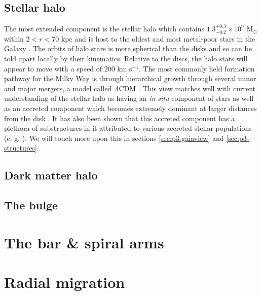 \subsection{Stellar halo}
The most extended component is the stellar halo which contains $1.3^{+0.3}_{-0.2} \times 10^9$ M$_\odot$ within $2 < r < 70$ kpc \citep{mackereth:20} and is host to the oldest and most metal-poor stars in the Galaxy \citep{dacosta:19, horta:22}. The orbits of halo stars is more spherical than the disks and so can be told apart locally by their kinematics. Relative to the discs, the halo stars will appear to move with a speed of 200 km s$^{-1}$. The most commonly held formation pathway for the Milky Way is through hierarchical growth through several minor and major mergers, a model called $\Lambda$CDM \cite{springel:05}. This view matches well with current understanding of the stellar halo as having an \textit{in situ} component of stars as well as an accreted component which becomes extremely dominant at larger distances from the disk \citep{naidu:20}. It has also been shown that this accreted component has a plethora of substructures in it attributed to various accreted stellar populations (e. g. \citealt{koppelman:19, feuillet:21, dodd:22}). We will touch more upon this in sections \ref{sec:p3-gaiaview} and \ref{sec:p3-structures}.

\subsection{Dark matter halo}


\subsection{The bulge}


\section{The bar \& spiral arms}\label{sec:barspirals}


\section{Radial migration}\label{sec:migration}
